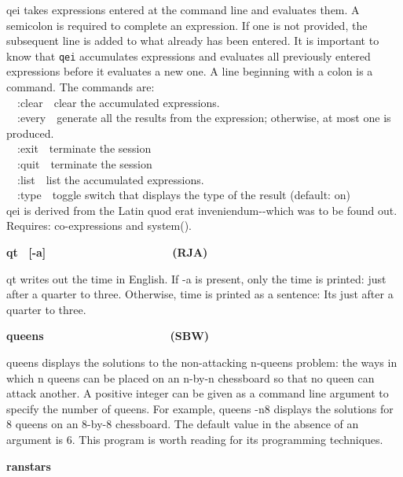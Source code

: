 {\textsf{qei} takes expressions entered at the command line and evaluates
them. A semicolon is required to complete an expression. If one is not
provided, the subsequent line is added to what already has been
entered. It is important to know that \texttt{qei} accumulates
expressions and evaluates all previously entered expressions before it
evaluates a new one. A line beginning with a colon is a command. The
commands are:\\
\ \ :clear\ \ clear the accumulated expressions.\\
\ \ :every\ \ generate all the results from the expression; otherwise,
at most one is produced.\\
\ \ :exit\ \ terminate the session\\
\ \ :quit\ \ terminate the session\\
\ \ :list\ \ list the accumulated expressions.\\
\ \ :type\ \ toggle switch that displays the type of the result
(default: on)\\
{\textquotedbl}qei{\textquotedbl} is derived from the Latin
{\textquotedbl}quod erat
inveniendum{\textquotedbl}-{}-{\textquotedbl}which was to be found
out{\textquotedbl}. Requires: co-expressions and \textsf{system()}.

{\sffamily\bfseries
qt
\ \textrm{\textmd{[-a]\ \ \ \ \ \ \ \ \ \ \ \ \ \ \ \ \ \ \ \ }}(RJA)}

\textsf{qt} writes out the time in English. If \textsf{{}-a} is present,
only the time is printed: \textsf{just after a quarter to three.}
Otherwise, time is printed as a sentence: \textsf{It{\textquotesingle}s
just after a quarter to three}.

{\sffamily\bfseries
queens\ \ \ \ \ \ \ \ \ \ \ \ \ \ \ \ \ \ \ \ (SBW)}

\textsf{queens} displays the solutions to the non-attacking
n-queens problem: the ways in which n queens can be
placed on an n-by-n chessboard so that no queen can attack another. A
positive integer can be given as a command line argument to specify the
number of queens. For example, \textsf{queens -n8} displays the
solutions for 8 queens on an 8-by-8 chessboard. The default value in
the absence of an argument is 6. This program is worth reading for its
programming techniques.

{\sffamily\bfseries
ranstars\ \ \ \ \ \ \ \ \ \ \ \ \ \ \ \ \ \ \ \ }

}
